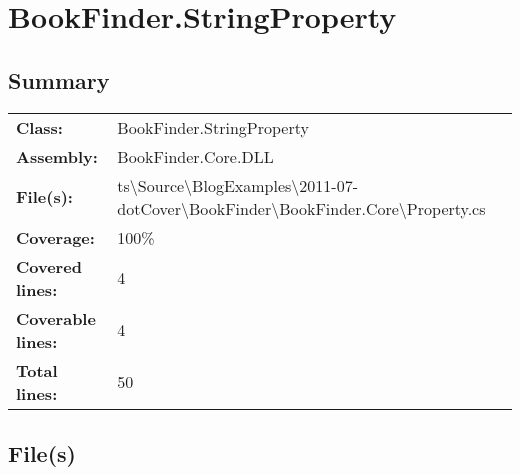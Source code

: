 \documentclass[a4paper,10pt]{article}
\begin{document}
\section{BookFinder.StringProperty}
\subsection{Summary}
\begin{longtable}[l]{ll}
\textbf{Class:} & BookFinder.StringProperty\\
\textbf{Assembly:} & BookFinder.Core.DLL\\
\textbf{File(s):} & \begin{minipage}[t]{12cm}{ts\textbackslash Source\textbackslash BlogExamples\textbackslash 2011-07-dotCover\textbackslash BookFinder\textbackslash BookFinder.Core\textbackslash Property.cs}\end{minipage} \\
\textbf{Coverage:} & 100\%\\
\textbf{Covered lines:} & 4\\
\textbf{Coverable lines:} & 4\\
\textbf{Total lines:} & 50\\
\end{longtable}
\subsection{File(s)}
\end{document}
